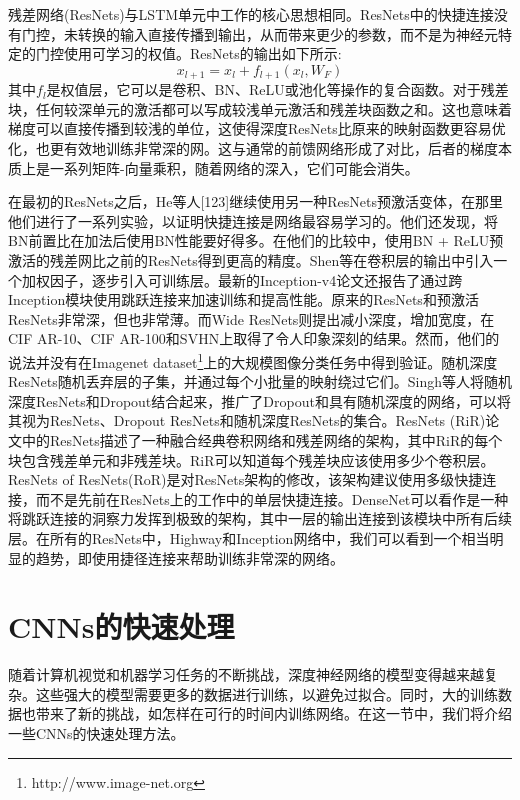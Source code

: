 \documentclass[final]{cvpr}
\begin{document}
残差网络(ResNets)与LSTM单元中工作的核心思想相同。ResNets中的快捷连接没有门控，未转换的输入直接传播到输出，从而带来更少的参数，而不是为神经元特定的门控使用可学习的权值。ResNets的输出如下所示:
\begin{equation}
	x_{l+1}=x_l+f_{l+1}(x_l,W_F)
\end{equation}
其中$f_l$是权值层，它可以是卷积、BN、ReLU或池化等操作的复合函数。对于残差块，任何较深单元的激活都可以写成较浅单元激活和残差块函数之和。这也意味着梯度可以直接传播到较浅的单位，这使得深度ResNets比原来的映射函数更容易优化，也更有效地训练非常深的网。这与通常的前馈网络形成了对比，后者的梯度本质上是一系列矩阵-向量乘积，随着网络的深入，它们可能会消失。

在最初的ResNets之后，He等人[123]继续使用另一种ResNets预激活变体，在那里他们进行了一系列实验，以证明快捷连接是网络最容易学习的。他们还发现，将BN前置比在加法后使用BN性能要好得多。在他们的比较中，使用BN + ReLU预激活的残差网比之前的ResNets得到更高的精度。Shen等在卷积层的输出中引入一个加权因子，逐步引入可训练层。最新的Inception-v4论文还报告了通过跨Inception模块使用跳跃连接来加速训练和提高性能。原来的ResNets和预激活ResNets非常深，但也非常薄。而Wide ResNets则提出减小深度，增加宽度，在CIF AR-10、CIF AR-100和SVHN上取得了令人印象深刻的结果。然而，他们的说法并没有在Imagenet dataset\footnote{http://www.image-net.org}上的大规模图像分类任务中得到验证。随机深度ResNets随机丢弃层的子集，并通过每个小批量的映射绕过它们。Singh等人将随机深度ResNets和Dropout结合起来，推广了Dropout和具有随机深度的网络，可以将其视为ResNets、Dropout ResNets和随机深度ResNets的集合。ResNets (RiR)论文中的ResNets描述了一种融合经典卷积网络和残差网络的架构，其中RiR的每个块包含残差单元和非残差块。RiR可以知道每个残差块应该使用多少个卷积层。ResNets of ResNets(RoR)是对ResNets架构的修改，该架构建议使用多级快捷连接，而不是先前在ResNets上的工作中的单层快捷连接。DenseNet可以看作是一种将跳跃连接的洞察力发挥到极致的架构，其中一层的输出连接到该模块中所有后续层。在所有的ResNets中，Highway和Inception网络中，我们可以看到一个相当明显的趋势，即使用捷径连接来帮助训练非常深的网络。
\section{CNNs的快速处理}

随着计算机视觉和机器学习任务的不断挑战，深度神经网络的模型变得越来越复杂。这些强大的模型需要更多的数据进行训练，以避免过拟合。同时，大的训练数据也带来了新的挑战，如怎样在可行的时间内训练网络。在这一节中，我们将介绍一些CNNs的快速处理方法。
\end{document}

